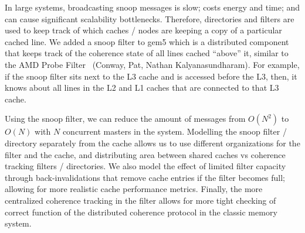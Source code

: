 In large systems, broadcasting snoop messages is slow; costs energy and time; and can cause significant scalability bottlenecks.
Therefore, directories and filters are used to keep track of which caches / nodes are keeping a copy of a particular cached line.
We added a snoop filter to gem5 which is a distributed component that keeps track of the coherence state of all lines cached “above” it, similar to the AMD Probe Filter~\cite{} (Conway, Pat, Nathan Kalyanasundharam).
For example, if the snoop filter sits next to the L3 cache and is accessed before the L3, then, it knows about all lines in the L2 and L1 caches that are connected to that L3 cache.

Using the snoop filter, we can reduce the amount of messages from $O(N^2)$ to $O(N)$ with $N$ concurrent masters in the system.
Modelling the snoop filter / directory separately from the cache allows us to use different organizations for the filter and the cache, and distributing area between shared caches vs coherence tracking filters / directories.
We also model the effect of limited filter capacity through back-invalidations that remove cache entries if the filter becomes full; allowing for more realistic cache performance metrics.
Finally, the more centralized coherence tracking in the filter allows for more tight checking of correct function of the distributed coherence protocol in the classic memory system.
